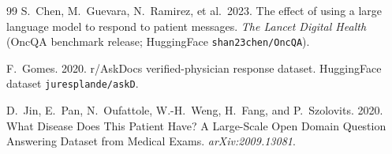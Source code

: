 \documentclass[11pt,a4paper]{article}
\begin{document}
\begin{thebibliography}{99}
S.~Chen, M.~Guevara, N.~Ramirez, et al.\ 2023.
\newblock The effect of using a large language model to respond to patient messages.
\newblock \textit{The Lancet Digital Health} (OncQA benchmark release; HuggingFace \texttt{shan23chen/OncQA}).

F.~Gomes. 2020.
\newblock r/AskDocs verified-physician response dataset.
\newblock HuggingFace dataset \texttt{juresplande/askD}.

D.~Jin, E.~Pan, N.~Oufattole, W.-H.~Weng, H.~Fang, and P.~Szolovits. 2020.
\newblock What Disease Does This Patient Have? A Large-Scale Open Domain Question Answering Dataset from Medical Exams.
\newblock \textit{arXiv:2009.13081}.

\end{thebibliography}
\end{document}
